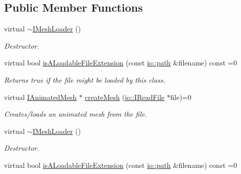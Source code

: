 \subsection*{Public Member Functions}
\begin{DoxyCompactItemize}
\item 
\mbox{\label{classirr_1_1scene_1_1IMeshLoader_ad20920b323a9902d50e8d09211730d4d}} 
virtual \hyperlink{classirr_1_1scene_1_1IMeshLoader_ad20920b323a9902d50e8d09211730d4d}{$\sim$\+I\+Mesh\+Loader} ()
\begin{DoxyCompactList}\small\item\em Destructor. \end{DoxyCompactList}\item 
virtual bool \hyperlink{classirr_1_1scene_1_1IMeshLoader_a64bd3f1f17b4ff1f0f4f929c850614f3}{is\+A\+Loadable\+File\+Extension} (const \hyperlink{namespaceirr_1_1io_a6468281622ce3a1c46b72e19f32dded5}{io\+::path} \&filename) const =0
\begin{DoxyCompactList}\small\item\em Returns true if the file might be loaded by this class. \end{DoxyCompactList}\item 
virtual \hyperlink{classirr_1_1scene_1_1IAnimatedMesh}{I\+Animated\+Mesh} $\ast$ \hyperlink{classirr_1_1scene_1_1IMeshLoader_ad09c19dd8c8608f0e49c40102e2aaee1}{create\+Mesh} (\hyperlink{classirr_1_1io_1_1IReadFile}{io\+::\+I\+Read\+File} $\ast$file)=0
\begin{DoxyCompactList}\small\item\em Creates/loads an animated mesh from the file. \end{DoxyCompactList}\item 
\mbox{\label{classirr_1_1scene_1_1IMeshLoader_ad20920b323a9902d50e8d09211730d4d}} 
virtual \hyperlink{classirr_1_1scene_1_1IMeshLoader_ad20920b323a9902d50e8d09211730d4d}{$\sim$\+I\+Mesh\+Loader} ()
\begin{DoxyCompactList}\small\item\em Destructor. \end{DoxyCompactList}\item 
virtual bool \hyperlink{classirr_1_1scene_1_1IMeshLoader_a64bd3f1f17b4ff1f0f4f929c850614f3}{is\+A\+Loadable\+File\+Extension} (const \hyperlink{namespaceirr_1_1io_a6468281622ce3a1c46b72e19f32dded5}{io\+::path} \&filename) const =0

\end{DoxyCompactItemize}
